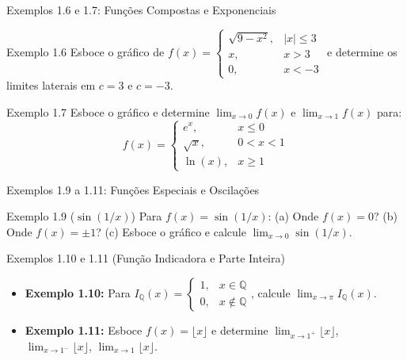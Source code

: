 \documentclass[10pt,aspectratio=169]{beamer}
\begin{document}
\begin{frame}{Exemplos 1.6 e 1.7: Funções Compostas e Exponenciais}
    \transfade
    \begin{exampleblock}{Exemplo 1.6}
        Esboce o gráfico de $f(x) = \begin{cases} \sqrt{9-x^2}, & |x| \le 3 \\ x, & x > 3 \\ 0, & x < -3 \end{cases}$ e determine os limites laterais em $c=3$ e $c=-3$.
    \end{exampleblock}

    \vspace{0.2cm}\pause
    \begin{exampleblock}{Exemplo 1.7}
        Esboce o gráfico e determine $\lim_{x \to 0} f(x)$ e $\lim_{x \to 1} f(x)$ para:
        $$f(x) = \begin{cases} e^x, & x \le 0 \\ \sqrt{x}, & 0 < x < 1 \\ \ln(x), & x \ge 1 \end{cases}$$
    \end{exampleblock}
\end{frame}

\begin{frame}{Exemplos 1.9 a 1.11: Funções Especiais e Oscilações}
    \transfade
    \begin{exampleblock}{Exemplo 1.9 ($\sin(1/x)$)}
        Para $f(x) = \sin(1/x)$: (a) Onde $f(x)=0$? (b) Onde $f(x)=\pm 1$? (c) Esboce o gráfico e calcule $\lim_{x \to 0} \sin(1/x)$.
    \end{exampleblock}

    \vspace{0.2cm}\pause
    \begin{exampleblock}{Exemplos 1.10 e 1.11 (Função Indicadora e Parte Inteira)}
        \begin{itemize}
            \item \textbf{Exemplo 1.10:} Para $I_{\mathbb{Q}}(x) = \begin{cases} 1, & x \in \mathbb{Q} \\ 0, & x \notin \mathbb{Q} \end{cases}$, calcule $\lim_{x \to \pi} I_{\mathbb{Q}}(x)$.
            \vspace{0.1cm}\pause
            \item \textbf{Exemplo 1.11:} Esboce $f(x) = \lfloor x \rfloor$ e determine $\lim_{x \to 1^+} \lfloor x \rfloor$, $\lim_{x \to 1^-} \lfloor x \rfloor$, $\lim_{x \to 1} \lfloor x \rfloor$.
        \end{itemize}
    \end{exampleblock}
\end{frame}
\end{document}
